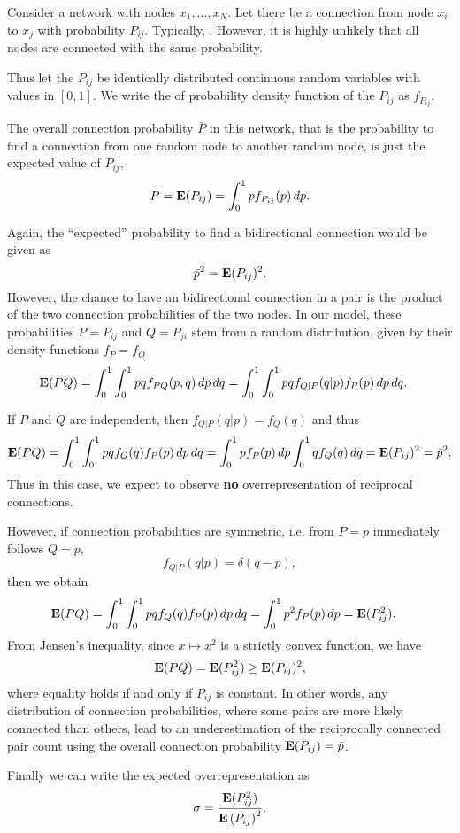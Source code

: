 
Consider a network with nodes $x_1,\dots,x_{N}$. Let there be a connection from node $x_i$ to $x_j$ with probability $P_{ij}$. Typically, . However, it is highly unlikely that all nodes are connected with the same probability. 

Thus let the $P_{ij}$ be identically distributed continuous random variables with values in $[0,1]$. We write the of probability density function of the $P_{ij}$ as $f_{P_{ij}}$.





The overall connection probability $\bar{P}$ in this network, that is the probability to find a connection from one random node to another random node, is just the expected value of $P_{ij}$,
\[
\bar{P} = \operatorname{\mathbf{E}}(P_{ij}) = \int_0^1 p f_{P_{ij}}(p)\, dp.
\]

Again, the \enquote{expected} probability to find a bidirectional connection would be given as
\[
\bar{p}^2 = \operatorname{\mathbf{E}}(P_{ij})^2.
\]
However, the chance to have an bidirectional connection in a pair is the product of the two connection probabilities of the two nodes. In our model, these probabilities $P=P_{ij}$ and $Q=P_{ji}$ stem from a random distribution, given by their density functions $f_P = f_Q$
%
\begin{align*}
\operatorname{\mathbf{E}}(PQ) & = \int_0^1 \int_0^1 pq f_{PQ}(p,q) \,dp\,dq = \int_0^1 \int_0^1 pq f_{Q|P}(q|p) f_{P}(p) \,dp\,dq.
\end{align*}

If $P$ and $Q$ are independent, then $f_{Q|P}(q|p) = f_Q(q)$ and thus
\[
\operatorname{\mathbf{E}}(PQ) = \int_0^1 \int_0^1 pq f_{Q}(q) f_{P}(p) \,dp\,dq = \int_0^1 p  f_{P}(p) \,dp \int_0^1  q f_{Q}(q) \,dq =  \operatorname{\mathbf{E}}(P_{ij})^2 = \bar{p}^2.
\]
Thus in this case, we expect to observe \textbf{no} overrepresentation of reciprocal connections.

However, if connection probabilities are symmetric, i.e. from $P = p$ immediately follows $Q=p$,
\[
f_{Q|P}(q|p) = \delta(q-p),
\]
then we obtain
%
\begin{align*}
\operatorname{\mathbf{E}}(PQ) & = \int_0^1 \int_0^1 pq f_{Q}(q) f_{P}(p) \,dp\,dq = \int_0^1 p^2  f_{P}(p) \,dp =  \operatorname{\mathbf{E}}(P_{ij}^2).
\end{align*}
%
From Jensen's inequality, since $x \mapsto x^2$ is a strictly convex function, we have
%
\[
\operatorname{\mathbf{E}}(PQ) = \operatorname{\mathbf{E}}(P_{ij}^2) \geq \operatorname{\mathbf{E}}(P_{ij})^2,
\]
where equality holds if and only if $P_{ij}$ is constant. In other words, any distribution of connection probabilities, where some pairs are more likely connected than others, lead to an underestimation of the reciprocally connected pair count using the overall connection probability $\operatorname{\mathbf{E}}(P_{ij}) = \bar{p}$.

Finally we can write the expected overrepresentation as
\[
\sigma = \frac{\operatorname{\mathbf{E}}(P_{ij}^2)}{{\operatorname{\mathbf{E}}\left(P_{ij}\right)}^2}.
\]


